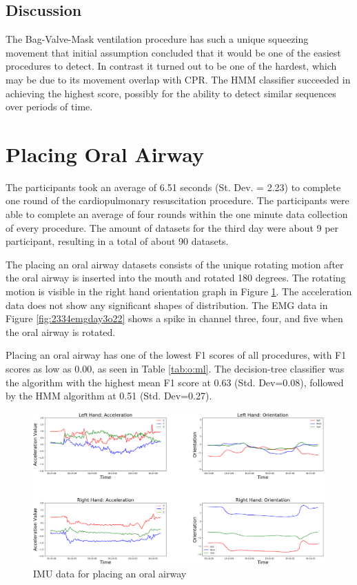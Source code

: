 \subsection{Discussion}
\label{sec:Results:BVM:Discussion}
The Bag-Valve-Mask ventilation procedure has such a unique squeezing movement that initial assumption concluded that it would be one of the easiest procedures to detect. In contrast it turned out to be one of the hardest, which may be due to its movement overlap with CPR. The HMM classifier succeeded in achieving the highest score, possibly for the ability to detect similar sequences over periods of time.
\section{Placing Oral Airway}
\label{sec:Results:Oral-Airway}
The participants took an average of 6.51 seconds (St. Dev. = 2.23) to complete one round of the cardiopulmonary resuscitation procedure. The participants were able to complete an average of four rounds within the one minute data collection of every procedure. The amount of datasets for the third day were about 9 per participant, resulting in a total of about 90 datasets.
\par The placing an oral airway datasets consists of the unique rotating motion after the oral airway is inserted into the mouth and rotated 180 degrees. The rotating motion is visible in the right hand orientation graph in Figure \ref{fig:2334imuday3o22}. The acceleration data does not show any significant shapes of distribution. The EMG data in Figure \ref{fig:2334emgday3o22} shows a spike in channel three, four, and five when the oral airway is rotated.
\par Placing an oral airway has one of the lowest F1 scores of all procedures, with F1 scores as low as 0.00, as seen in Table \ref{tab:o:ml}. The decision-tree classifier was the algorithm with the highest mean F1 score at 0.63 (Std. Dev=0.08), followed by the HMM algorithm at 0.51 (Std. Dev=0.27).
\begin{figure}
	\centering
	\includegraphics[width=0.8\linewidth]{pictures/2334_IMU_Day3_o_22}
	\caption{IMU data for placing an oral airway}
	\label{fig:2334imuday3o22}
\end{figure}
